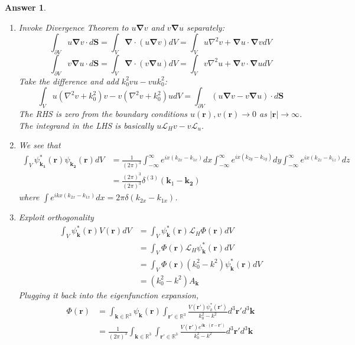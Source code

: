 \documentclass[a4paper]{article}
\newtheorem{ans}{Answer}[section]
\theoremstyle{new}
\begin{document}
\begin{ans}\leavevmode
\begin{enumerate}[label=(\roman*)]
\item Invoke Divergence Theorem to $u\boldsymbol{\nabla}v$ and $v\boldsymbol{\nabla}u$ separately:
$$\int_{\partial V}u\boldsymbol{\nabla}v\cdot d\mathbf{S}=\int_V\boldsymbol{\nabla}\cdot(u\boldsymbol{\nabla}v)dV=\int_Vu\nabla^2v+\boldsymbol{\nabla}u\cdot\boldsymbol{\nabla}vdV$$
$$\int_{\partial V}v\boldsymbol{\nabla}u\cdot d\mathbf{S}=\int_V\boldsymbol{\nabla}\cdot(v\boldsymbol{\nabla}u)dV=\int_Vv\nabla^2u+\boldsymbol{\nabla}v\cdot\boldsymbol{\nabla}udV$$
Take the difference and add $k_0^2vu-vuk_0^2$:
$$\int_Vu(\nabla^2v+k_0^2)v-v(\nabla^2v+k_0^2)udV=\int_{\partial V}(u\boldsymbol{\nabla}v-v\boldsymbol{\nabla}u)\cdot d\mathbf{S}$$
The RHS is zero from the boundary conditions $u(\mathbf{r}),v(\mathbf{r})\rightarrow 0$ as $|\mathbf{r}|\rightarrow\infty$. The integrand in the LHS is basically $u\mathcal{L}_Hv-v\mathcal{L}_u$.
\item We see that
\begin{align}
\int_V\psi_{\mathbf{k_1}}^*(\mathbf{r})\psi_{\mathbf{k_2}}(\mathbf{r})dV&=\frac{1}{(2\pi)^3}\int_{-\infty}^\infty e^{ix(k_{2x}-k_{1x})}dx\int_{-\infty}^\infty e^{ix(k_{2y}-k_{1y})}dy\int_{-\infty}^\infty e^{ix(k_{2z}-k_{1z})}dz\nonumber\\&=\frac{(2\pi)^3}{(2\pi)^3}\delta^{(3)}(\mathbf{k}_1-\mathbf{k_2})\nonumber
\end{align}
where $\int e^{ikx(k_{2x}-k_{1x})}dx=2\pi\delta(k_{2x}-k_{1x})$.
\item Exploit orthogonality
\begin{align}
\int_V\psi^*_{\mathbf{k}}(\mathbf{r})V(\mathbf{r})dV&=\int_V\psi_{\mathbf{k}}^*(\mathbf{r})\mathcal{L}_H\Phi(\mathbf{r})dV\nonumber\\&=\int_V\Phi(\mathbf{r})\mathcal{L}_H\psi_{\mathbf{k}}^*(\mathbf{r})dV\nonumber\\&=\int_V\Phi(\mathbf{r})(k_0^2-k^2)\psi_{\mathbf{k}}^*(\mathbf{r})dV\nonumber\\&=(k_0^2-k^2)A_{\mathbf{k}}\nonumber
\end{align}
Plugging it back into the eigenfunction expansion,
\begin{align}
\Phi(\mathbf{r})&=\int_{\mathbf{k}\in\mathbb{R}^3}\psi_{\mathbf{k}}(\mathbf{r})\int_{\mathbf{r'}\in\mathbb{R}^3}\frac{V(\mathbf{r'})\psi_k^*(\mathbf{r'})}{k_0^2-k^2}d^3\mathbf{r'}d^3\mathbf{k}\nonumber\\&=\frac{1}{(2\pi)^3}\int_{\mathbf{k}\in\mathbb{R}^3}\int_{\mathbf{r'}\in\mathbb{R}^3}\frac{V(\mathbf{r'})e^{i\mathbf{k}\cdot(\mathbf{r}-\mathbf{r'})}}{k_0^2-k^2}d^3\mathbf{r'}d^3\mathbf{k}\nonumber

\end{align}
\end{enumerate}
\end{ans}
\end{document}
